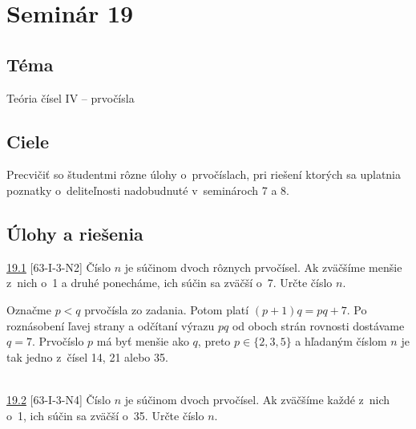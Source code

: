 \section*{Seminár 19}


\subsection*{Téma}
Teória čísel IV -- prvočísla

\subsection*{Ciele}
Precvičiť so študentmi rôzne úlohy o~prvočíslach, pri riešení ktorých sa uplatnia poznatky o~deliteľnosti nadobudnuté v~seminároch 7 a 8.

\subsection*{Úlohy a riešenia}
\begin{tcolorbox}[breakable,notitle,boxrule=0pt,colback=light-gray,colframe=light-gray]\ul{19.1} [63-I-3-N2] Číslo $n$ je súčinom dvoch rôznych prvočísel. Ak zväčšíme menšie z~nich o~1 a druhé ponecháme, ich súčin sa zväčší o~7. Určte číslo $n$.

\end{tcolorbox}

\rie Označme $p<q$ prvočísla zo zadania. Potom platí $(p+1)q=pq+7$. Po roznásobení ľavej strany a odčítaní výrazu $pq$ od oboch strán rovnosti dostávame $q=7$. Prvočíslo $p$ má byť menšie ako $q$, preto $p\in \{2,3,5\}$ a hľadaným číslom $n$ je tak jedno z~čísel 14, 21 alebo 35.\\
\\
\begin{tcolorbox}[breakable,notitle,boxrule=0pt,colback=light-gray,colframe=light-gray]\ul{19.2} [63-I-3-N4] Číslo $n$ je súčinom dvoch prvočísel. Ak zväčšíme každé z~nich o~1, ich súčin sa zväčší o~35. Určte číslo $n$.

\end{tcolorbox}

